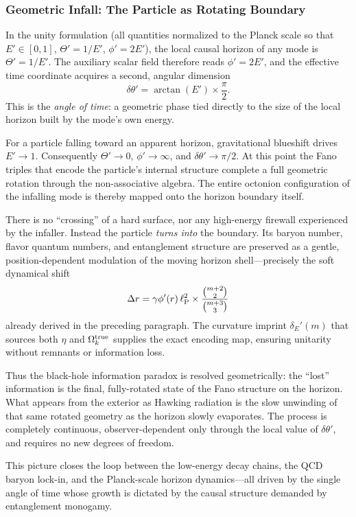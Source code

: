 \documentclass[12pt,a4paper]{article}
\begin{document}
\subsubsection{Geometric Infall: The Particle as Rotating Boundary}

In the unity formulation (all quantities normalized to the Planck scale so that $E' \in [0,1]$, $\Theta' = 1/E'$, $\phi' = 2E'$), the local causal horizon of any mode is $\Theta' = 1/E'$. The auxiliary scalar field therefore reads $\phi' = 2E'$, and the effective time coordinate acquires a second, angular dimension
\[
\delta\theta' = \arctan(E') \times \frac{\pi}{2}.
\]
This is the \emph{angle of time}: a geometric phase tied directly to the size of the local horizon built by the mode's own energy.

For a particle falling toward an apparent horizon, gravitational blueshift drives $E' \to 1$. Consequently $\Theta' \to 0$, $\phi' \to \infty$, and $\delta\theta' \to \pi/2$. At this point the Fano triples that encode the particle's internal structure complete a full geometric rotation through the non-associative algebra. The entire octonion configuration of the infalling mode is thereby mapped onto the horizon boundary itself.

There is no ``crossing'' of a hard surface, nor any high-energy firewall experienced by the infaller. Instead the particle \emph{turns into} the boundary. Its baryon number, flavor quantum numbers, and entanglement structure are preserved as a gentle, position-dependent modulation of the moving horizon shell---precisely the soft dynamical shift
\[
\Delta r = \gamma \phi'(r) \,\ell_{\rm P}^2 \times \frac{\binom{m+2}{2}}{\binom{m+3}{3}}
\]
already derived in the preceding paragraph. The curvature imprint $\delta_E'(m)$ that sources both $\eta$ and $\Omega_k^{\rm true}$ supplies the exact encoding map, ensuring unitarity without remnants or information loss.

Thus the black-hole information paradox is resolved geometrically: the ``lost'' information is the final, fully-rotated state of the Fano structure on the horizon. What appears from the exterior as Hawking radiation is the slow unwinding of that same rotated geometry as the horizon slowly evaporates. The process is completely continuous, observer-dependent only through the local value of $\delta\theta'$, and requires no new degrees of freedom.

This picture closes the loop between the low-energy decay chains, the QCD baryon lock-in, and the Planck-scale horizon dynamics---all driven by the single angle of time whose growth is dictated by the causal structure demanded by entanglement monogamy.
\end{document}
